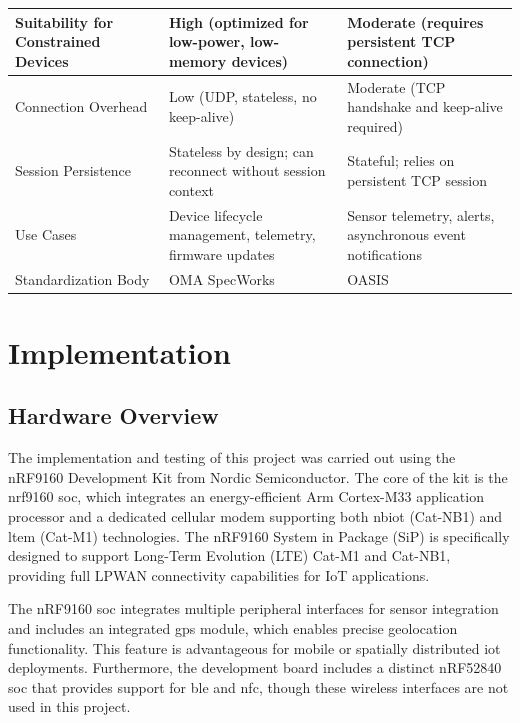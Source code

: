 \documentclass[12pt, english, openany]{book}
\begin{document}
\begin{table}[htbp]
\begin{tabularx}{\textwidth}{|l|X|X|}
        Suitability for Constrained Devices & High (optimized for low-power, low-memory devices)            & Moderate (requires persistent TCP connection)                    \\ \hline
        Connection Overhead                 & Low (UDP, stateless, no keep-alive)                           & Moderate (TCP handshake and keep-alive required)                 \\ \hline
        Session Persistence                 & Stateless by design; can reconnect without session context    & Stateful; relies on persistent TCP session                       \\ \hline
        Use Cases                           & Device lifecycle management, telemetry, firmware updates      & Sensor telemetry, alerts, asynchronous event notifications       \\ \hline
        Standardization Body                & OMA SpecWorks                                                 & OASIS                                                            \\ \hline
    \end{tabularx}
\end{table}

\FloatBarrier

\chapter{Implementation} \label{chap:implementation}
\section{Hardware Overview} \label{sec:hardware_overview}



The implementation and testing of this project was carried out using the nRF9160 Development Kit from Nordic Semiconductor. The core of the kit is the nrf9160 \gls{soc}, which integrates an energy-efficient Arm Cortex-M33 application processor and a dedicated cellular modem supporting both \gls{nbiot} (Cat-NB1) and \gls{ltem} (Cat-M1) technologies. The nRF9160 System in Package (SiP) is specifically designed to support Long-Term Evolution (LTE) Cat-M1 and Cat-NB1, providing full LPWAN connectivity capabilities for IoT applications.

The nRF9160 \gls{soc} integrates multiple peripheral interfaces for sensor integration and includes an integrated \gls{gps} module, which enables precise geolocation functionality. This feature is advantageous for mobile or spatially distributed \gls{iot} deployments. Furthermore, the development board includes a distinct nRF52840 \gls{soc} that provides support for \gls{ble} and \gls{nfc}, though these wireless interfaces are not used in this project.
\end{document}

